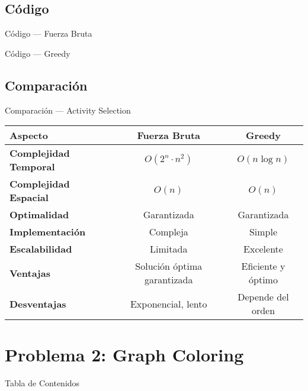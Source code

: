 \documentclass[aspectratio=169]{beamer}
\begin{document}
\subsection{Código}
\begin{frame}{Código — Fuerza Bruta}
\end{frame}

\begin{frame}{Código — Greedy}
\end{frame}

\subsection{Comparación}
\begin{frame}{Comparación — Activity Selection}
  \begin{table}[h]
  \centering
  \begin{tabular}{|l|c|c|}
  \hline
  \textbf{Aspecto} & \textbf{Fuerza Bruta} & \textbf{Greedy} \\
  \hline
  \textbf{Complejidad Temporal} & $O(2^n \cdot n^2)$ & $O(n \log n)$ \\
  \textbf{Complejidad Espacial} & $O(n)$ & $O(n)$ \\
  \textbf{Optimalidad} & Garantizada & Garantizada \\
  \textbf{Implementación} & Compleja & Simple \\
  \textbf{Escalabilidad} & Limitada & Excelente \\
  \hline
  \textbf{Ventajas} & Solución óptima garantizada & Eficiente y óptimo \\
  \textbf{Desventajas} & Exponencial, lento & Depende del orden \\
  \hline
  \end{tabular}
  \end{table}
\end{frame}

\section{Problema 2: Graph Coloring}
\begin{frame}{Tabla de Contenidos}
\end{frame}
\end{document}
